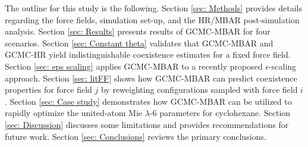 \documentclass[journal=jced,manuscript=article]{achemso}
\begin{document}
The outline for this study is the following. Section \ref{sec: Methods} provides details regarding the force fields, simulation set-up, and the HR/MBAR post-simulation analysis. Section \ref{sec: Results} presents results of GCMC-MBAR for four scenarios. Section \ref{sec: Constant theta} validates that GCMC-MBAR and GCMC-HR yield indistinguishable coexistence estimates for a fixed force field. Section \ref{sec: eps scaling} applies GCMC-MBAR to a recently proposed $\epsilon$-scaling approach. Section \ref{sec: litFF} shows how GCMC-MBAR can predict coexistence properties for force field $j$ by reweighting configurations sampled with force field $i$. Section \ref{sec: Case study} demonstrates how GCMC-MBAR can be utilized to rapidly optimize the united-atom Mie $\lambda$-6 parameters for cyclohexane. Section \ref{sec: Discussion} discusses some limitations and provides recommendations for future work. Section \ref{sec: Conclusions} reviews the primary conclusions.


%
\end{document}
